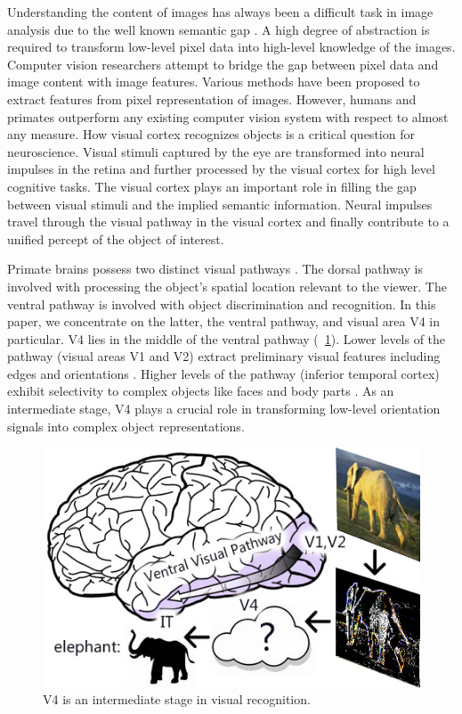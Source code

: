 \documentclass[10pt]{article}
\begin{document}
Understanding the content of images has always been a difficult task in image analysis
due to the well known semantic gap \cite{smeulders2000}.
A high degree of abstraction is required to transform low-level pixel data into high-level knowledge of the images.
Computer vision researchers attempt to bridge the gap between pixel data and image content with image features.
Various methods have been proposed to extract features from pixel representation of images.
However, humans and primates outperform any existing computer vision system with respect to almost any measure.
How visual cortex recognizes objects is a critical question for neuroscience.
Visual stimuli captured by the eye are transformed into neural impulses in the retina and further processed by 
the visual cortex for high level cognitive tasks.
The visual cortex plays an important role in filling the gap
between visual stimuli and the implied semantic information.
Neural impulses travel through the visual pathway \cite{ettlinger1990}
in the visual cortex and finally contribute to a unified percept of the object of interest. 

Primate brains possess two distinct visual pathways \cite{ettlinger1990,lehky2007}.
The dorsal pathway is involved with processing the object's spatial location relevant to the viewer. 
The ventral pathway is involved with object discrimination and recognition.
In this paper, we concentrate on the latter, the ventral pathway, and visual area V4 in particular.
V4 lies in the middle of the ventral pathway (\figurename~\ref{fig:1}).
Lower levels of the pathway (visual areas V1 and V2) extract preliminary visual features 
including edges and orientations \cite{hubel1962,hubel1965}.
Higher levels of the pathway (inferior temporal cortex) exhibit selectivity to complex objects
like faces and body parts \cite{bruce1981,bell2009}.
As an intermediate stage, V4 plays a crucial role in transforming low-level orientation signals 
into complex object representations.

\begin{figure}
\centerline{\includegraphics[width=0.8\linewidth]{images/fig-1.jpg}} 
\caption{V4 is an intermediate stage in visual recognition.}
\label{fig:1}
\end{figure}
\end{document}
